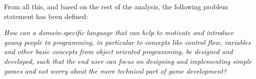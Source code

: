 From all this, and based on the rest of the analysis, the following problem statement has been defined:

\textit{How can a domain-specific language that can help to motivate and introduce young people to programming, in particular to concepts like control flow, variables and other basic concepts from object oriented programming, be designed and developed, such that the end user can focus on designing and implementing simple games and not worry about the more technical part of game development?}
